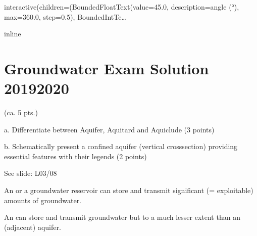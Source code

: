 \documentclass[letterpaper,10pt,english]{sphinxmanual}
\begin{document}
\begin{sphinxVerbatim}[commandchars=\\\{\}]
interactive(children=(BoundedFloatText(value=45.0, description=\PYGZsq{}angle (°)\PYGZsq{}, max=360.0, step=0.5), BoundedIntTe…
\end{sphinxVerbatim}

\begin{sphinxVerbatim}[commandchars=\\\{\}]
   
    
   
   
   
   
 inline 
    
\end{sphinxVerbatim}


\section{Groundwater Exam Solution \sphinxhyphen{}  2019\sphinxhyphen{}2020}
\label{\detokenize{contents/questions/GW_exam_2019_20:groundwater-exam-solution-2019-2020}}\label{\detokenize{contents/questions/GW_exam_2019_20::doc}}

   (ca. 5 pts.)

a. Differentiate between Aquifer, Aquitard and Aquiclude (3 points)

b. Schematically present a confined aquifer (vertical cross\sphinxhyphen{}section) providing essential features with their legends (2 points)


See slide: L03/08

An  or a groundwater reservoir can store and transmit significant (= exploitable) amounts of groundwater.

An  can store and transmit groundwater but to a much lesser extent than an (adjacent) aquifer.
\end{document}
